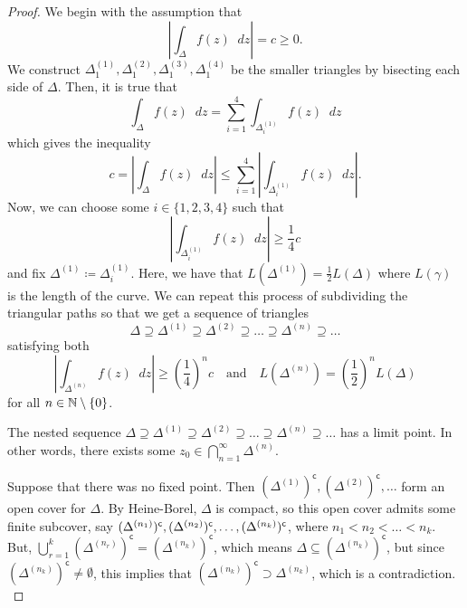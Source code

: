 \documentclass[11pt]{article}
\newcommand*\dif{\mathop{}\!d}
\begin{document}
\begin{proof}
	We begin with the assumption that
	\begin{equation*}
		\left|\int_{\Delta} f(z)\dif z \right| = c \geq 0.
	\end{equation*}
	We construct $\Delta^{(1)}_1, \Delta^{(2)}_1, \Delta^{(3)}_1,
	\Delta^{(4)}_1$ be the smaller triangles by bisecting each side of $\Delta$.
	Then, it is true that
	\begin{equation*}
		\int_{\Delta} f(z) \dif z = \sum^4_{i=1} \int_{\Delta^{(1)}_i}
		f(z) \dif z
	\end{equation*}
	which gives the inequality
	\begin{equation*}
		c = \left|\int_{\Delta} f(z) \dif z \right| \leq \sum^4_{i=1} \left|
		\int_{\Delta^{(1)}_i} f(z) \dif z \right|.
	\end{equation*}
	Now, we can choose some $i \in \{1,2,3,4\}$ such that
	\begin{equation*}
		\left| \int_{\Delta^{(1)}_i} f(z) \dif z \right| \geq \frac{1}{4}c 	
	\end{equation*}
	and fix $\Delta^{(1)} \coloneqq \Delta^{(1)}_i$. Here, we have that
	$L(\Delta^{(1)}) = \frac{1}{2}L(\Delta)$ where $L(\gamma)$ is the length of
	the curve. We can repeat this process of subdividing the triangular paths so
	that we get a sequence of triangles
	\begin{equation*}
		\Delta \supseteq \Delta^{(1)} \supseteq \Delta^{(2)} \supseteq \dots
		\supseteq \Delta^{(n)} \supseteq \dots
	\end{equation*}
	satisfying both
	\begin{equation*}
		\left|\int_{\Delta^{(n)}} f(z) \dif z \right| \geq
		\left(\frac{1}{4}\right)^n c \quad \text{and} \quad L(\Delta^{(n)}) =
		\left(\frac{1}{2}\right)^n L(\Delta)
	\end{equation*}
	for all $n \in \mathbb{N} \setminus \{0\}$.
	\begin{claim}
		The nested sequence $\Delta \supseteq \Delta^{(1)} \supseteq
		\Delta^{(2)} \supseteq \dots \supseteq \Delta^{(n)} \supseteq \dots$ has
		a limit point. In other words, there exists some $z_0 \in
		\bigcap^\infty_{n=1} \Delta^{(n)}$.
	\end{claim}	
	
	Suppose that there was no fixed point. Then $(\Delta^{(1)})^\mathsf{c},
	(\Delta^{(2)})^\mathsf{c}, \dots$ form an open cover for $\Delta$. By
	Heine-Borel, $\Delta$ is compact, so this open cover admits some finite
	subcover, say $\splitatcommas{(\Delta^{(n_1)})^\mathsf{c},
	(\Delta^{(n_2)})^\mathsf{c}, \dots, (\Delta^{(n_k)})^\mathsf{c}}$, where
	$n_1 < n_2 < \dots < n_k$. But, $\bigcup^k_{r=1}(\Delta^{(n_r)})^\mathsf{c}
	= (\Delta^{(n_k)})^\mathsf{c}$, which means $\Delta \subseteq
	(\Delta^{(n_k)})^\mathsf{c}$, but since $(\Delta^{(n_k)})^\mathsf{c} \neq
	\emptyset$, this implies that $(\Delta^{(n_k)})^\mathsf{c} \supset
	\Delta^{(n_k)}$, which is a contradiction.\\


\end{proof}
\end{document}
